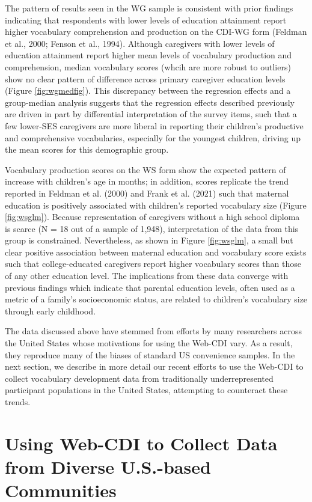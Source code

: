 \documentclass[
  english,
  ,man,floatsintext]{apa6}
\begin{document}
The pattern of results seen in the WG sample is consistent with prior findings indicating that respondents with lower levels of education attainment report higher vocabulary comprehension and production on the CDI-WG form (Feldman et al., 2000; Fenson et al., 1994). Although caregivers with lower levels of education attainment report higher mean levels of vocabulary production and comprehension, median vocabulary scores (whcih are more robust to outliers) show no clear pattern of difference across primary caregiver education levels (Figure \ref{fig:wgmedfig}). This discrepancy between the regression effects and a group-median analysis suggests that the regression effects described previously are driven in part by differential interpretation of the survey items, such that a few lower-SES caregivers are more liberal in reporting their children's productive and comprehensive vocabularies, especially for the youngest children, driving up the mean scores for this demographic group.

Vocabulary production scores on the WS form show the expected pattern of increase with children's age in months; in addition, scores replicate the trend reported in Feldman et al. (2000) and Frank et al. (2021) such that maternal education is positively associated with children's reported vocabulary size (Figure \ref{fig:wsglm}). Because representation of caregivers without a high school diploma is scarce (N = 18 out of a sample of 1,948), interpretation of the data from this group is constrained. Nevertheless, as shown in Figure \ref{fig:wsglm}, a small but clear positive association between maternal education and vocabulary score exists such that college-educated caregivers report higher vocabulary scores than those of any other education level. The implications from these data converge with previous findings which indicate that parental education levels, often used as a metric of a family's socioeconomic status, are related to children's vocabulary size through early childhood.

The data discussed above have stemmed from efforts by many researchers across the United States whose motivations for using the Web-CDI vary. As a result, they reproduce many of the biases of standard US convenience samples. In the next section, we describe in more detail our recent efforts to use the Web-CDI to collect vocabulary development data from traditionally underrepresented participant populations in the United States, attempting to counteract these trends.

\hypertarget{using-web-cdi-to-collect-data-from-diverse-u.s.-based-communities}{%
\section{Using Web-CDI to Collect Data from Diverse U.S.-based Communities}\label{using-web-cdi-to-collect-data-from-diverse-u.s.-based-communities}}
\end{document}

